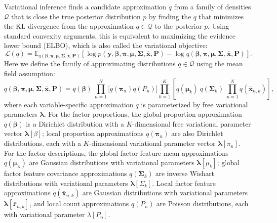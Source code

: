 \documentclass[twoside,11pt]{article}
\newcommand{\E}{\mathbb{E}}
\begin{document}
Variational inference finds a candidate approximation $q$ from a family of densities $\mathcal{Q}$ that is close the true posterior distribution $p$ by finding the $q$ that minimizes the KL divergence from the approximation $q\in\mathcal{Q}$ to the posterior $p$.  Using standard convexity arguments, this is equivalent to maximizing the evidence lower bound (ELBO), which is also called the variational objective:
\begin{equation}
    \mathcal{L}(q)  = \E_{q(\boldsymbol{\beta}, \boldsymbol{\pi}, \boldsymbol{\mu}, \boldsymbol{\Sigma}, \boldsymbol{\bar{x}}, \boldsymbol{P})}\left[\log p(\boldsymbol{y}, \boldsymbol{\beta}, \boldsymbol{\pi}, \boldsymbol{\mu}, \boldsymbol{\Sigma}, \boldsymbol{\bar{x}}, \boldsymbol{P}) - \log q(\boldsymbol{\beta}, \boldsymbol{\pi}, \boldsymbol{\mu}, \boldsymbol{\Sigma}, \boldsymbol{\bar{x}}, \boldsymbol{P})\right].
    \label{eq:ELBO}
\end{equation}
Here we define the family of approximating distributions $q\in\mathcal{Q}$ using the mean field assumption:
\begin{equation}
    q\left(\boldsymbol{\beta}, \boldsymbol{\pi}, \boldsymbol{\mu}, \boldsymbol{\Sigma}, \boldsymbol{\bar{x}}, \boldsymbol{P}\right) = 
    q\left(\boldsymbol{\beta}\right) ~\prod_{n=1}^N \Big[ q\left(\boldsymbol{\pi}_{n}\right) q\left(P_{n}\right) \Big]
    \prod_{k=1}^K \left[ q\left(\boldsymbol{\mu}_k\right)~q\left(\boldsymbol{\Sigma}_k\right) ~\prod_{n=1}^N q\left(\boldsymbol{\bar{x}}_{n,k}\right)\right],
\end{equation}
where each variable-specific approximation $q$ is parameterized by free variational parameters $\boldsymbol{\lambda}$.
For the factor proportions, the global proportion approximation $q(\boldsymbol{\beta})$ is a Dirichlet distribution with a $K$-dimensional free variational parameter vector $\boldsymbol{\lambda}[\beta]$; local proportion approximations $q(\boldsymbol{\pi}_n)$ are also Dirichlet distributions, each with a $K$-dimensional variational parameter vector $\boldsymbol{\lambda}[\pi_{n}]$.
For the factor descriptions, the global factor feature mean approximations $q(\boldsymbol{\mu_{k}})$ are Gaussian distributions with variational parameters $\boldsymbol{\lambda}[\mu_{k}]$; global factor feature covariance approximations $q(\boldsymbol{\Sigma}_{k})$ are inverse Wishart distributions with variational parameters $\boldsymbol{\lambda}[\Sigma_{k}]$. Local factor feature approximations $q(\boldsymbol{\bar{x}}_{n,k})$ are Gaussian distributions with variational parameters $\boldsymbol{\lambda}[{\bar{x}}_{n,k}]$, and
local count approximations $q(P_{n})$ are Poisson distributions, each with variational parameter $\lambda[{P}_{n}]$.
\end{document}
